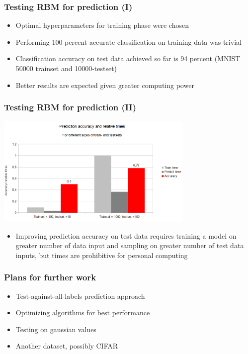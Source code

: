 \documentclass{beamer}
\begin{document}
  \begin{frame}
    \frametitle{Testing RBM for prediction (I)}
    \begin{itemize}
    \item Optimal hyperparameters for training phase were chosen
	\item Performing 100 percent accurate classification on training data was trivial 
	\item Classification accuracy on test data achieved so far is 94 percent (MNIST 50000 trainset and 10000-testset)
	\item Better results are expected given greater computing power
	\end{itemize}
  \end{frame}
  \begin{frame}
    \frametitle{Testing RBM for prediction (II)}
    \includegraphics[width=9.5cm]{images/acc.png}
    \begin{itemize}
	\item Improving prediction accuracy on test data requires training a model on greater number of data input and sampling on greater number of test data inputs, but times are prohibitive for personal computing
	\end{itemize}
  \end{frame}
  \begin{frame}
    \frametitle{Plans for further work}
    \begin{itemize}
    \item Test-against-all-labels prediction approach
    \item Optimizing algorithms for best performance
	\item Testing on gaussian values
	\item Another dataset, possibly CIFAR
	\end{itemize}
  \end{frame}
\end{document}
